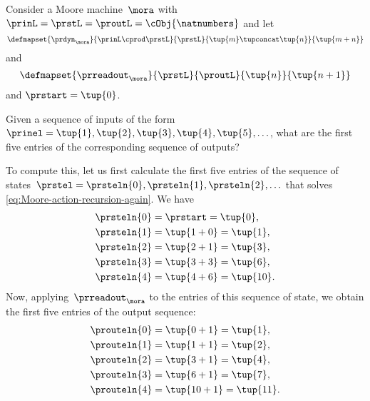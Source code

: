 \begin{example}
    \label{exa:moore-standard-action}
    Consider a Moore machine~$\mora$ with~$\prinL = \prstL = \proutL = \cObj{\natnumbers}$ and let
    \begin{equation}
        \defmapset{
            \prdyn_\mora
        }{
            \prinL \cprod \prstL
        }{
            \prstL
        }{
            \tup{m} \tupconcat \tup{n}
        }{
            \tup{m + n}
        }
    \end{equation}
    and
    \begin{equation}
        \defmapset{
            \prreadout_\mora
        }{
            \prstL
        }{
            \proutL
        }{
            \tup{n}
        }{
            \tup{n+1}
        }
    \end{equation}
    and $\prstart = \tup{0}$.

    Given a sequence of inputs of the form~$\prinel = \tup{1}, \tup{2}, \tup{3}, \tup{4}, \tup{5}, \ldots$, what are the first five entries of the corresponding sequence of outputs?

    To compute this, let us first calculate the first five entries of the sequence of states~$\prstel = \prsteln{0}, \prsteln{1}, \prsteln{2}, \ldots$ that solves \cref{eq:Moore-action-recursion-again}.
    We have
    \begin{align*}
        \prsteln{0} & = \prstart = \tup{0}, \\
        \prsteln{1} & = \tup{1 + 0} = \tup{1}, \\
        \prsteln{2} & = \tup{2 + 1} = \tup{3}, \\
        \prsteln{3} & = \tup{3 + 3} = \tup{6}, \\
        \prsteln{4} & = \tup{4 + 6} = \tup{10}.
    \end{align*}
    Now, applying~$\prreadout_\mora$ to the entries of this sequence of state, we obtain the first five entries of the output sequence:
    \begin{align*}
        \prouteln{0} & = \tup{0 + 1} = \tup{1}, \\
        \prouteln{1} & = \tup{1 + 1} = \tup{2}, \\
        \prouteln{2} & = \tup{3 + 1} = \tup{4}, \\
        \prouteln{3} & = \tup{6 + 1} = \tup{7}, \\
        \prouteln{4} & = \tup{10 + 1} = \tup{11}.
    \end{align*}
\end{example}

